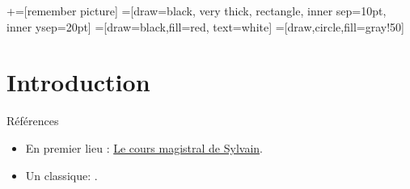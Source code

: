 \usetikzlibrary{positioning}
\usetikzlibrary{snakes}
\usetikzlibrary{calc}
\usetikzlibrary{arrows}
\usetikzlibrary{decorations.markings}
\usetikzlibrary{shapes.misc}
\usetikzlibrary{matrix,shapes,arrows,fit,tikzmark}
\usetikzlibrary{matrix,chains,positioning,decorations.pathreplacing,arrows}
\usetikzlibrary{shapes}
\usetikzlibrary{shapes.geometric, arrows}
\newcommand\marktopleft[1]{
    \tikz[overlay,remember picture] 
        \node (marker-#1-a) at (-.3em,.3em) {};%
}
\newcommand\markbottomright[2]{%
    \tikz[overlay,remember picture] 
        \node (marker-#1-b) at (0em,0em) {};%
}
+=[remember picture] 
 =[draw=black, very thick, rectangle, inner sep=10pt, inner ysep=20pt]
 =[draw=black,fill=red, text=white]
=[draw,circle,fill=gray!50]

\begin{frame}
\titlepage
\end{frame}
\begin{frame}
 \tableofcontents
    \end{frame}

\section{Introduction}
\frame{\sectionpage}

\begin{frame}
  [allowframebreaks]{Références}
  \begin{itemize}
\item En premier lieu : \href{https://cours.univ-grenoble-alpes.fr/course/view.php?id=5946\#section-1}{Le cours magistral de Sylvain}.
\item Un classique: \cite{Tirole_BookIO_1988}.
\end{itemize}
\end{frame}
